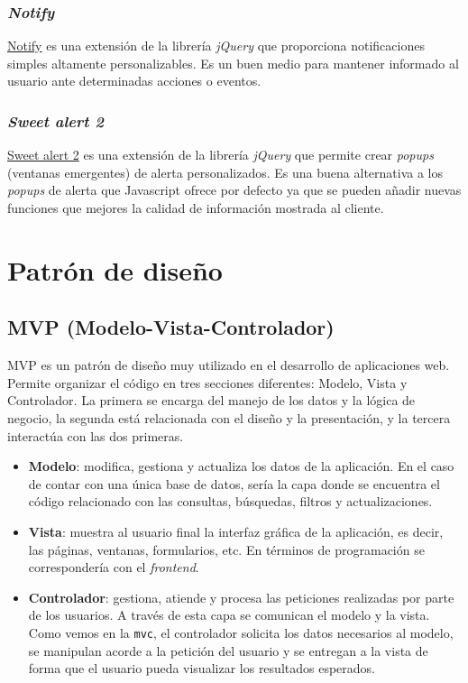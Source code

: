 \subsubsection{\emph{Notify}}

\href{https://notifyjs.jpillora.com/}{Notify} es una extensión de la
librería \emph{jQuery} que proporciona notificaciones simples altamente
personalizables. Es un buen medio para mantener informado al usuario
ante determinadas acciones o eventos.

\subsubsection{\emph{Sweet alert 2}}

\href{https://github.com/sweetalert2/sweetalert2}{Sweet alert 2} es una
extensión de la librería \emph{jQuery} que permite crear \emph{popups}
(ventanas emergentes) de alerta personalizados. Es una buena alternativa
a los \emph{popups} de alerta que Javascript ofrece por defecto ya que
se pueden añadir nuevas funciones que mejores la calidad de información
mostrada al cliente.

\section{Patrón de diseño}

\subsection{MVP (Modelo-Vista-Controlador)}

MVP es un patrón de diseño muy utilizado en el desarrollo de
aplicaciones web. Permite organizar el código en tres secciones
diferentes: Modelo, Vista y Controlador. La primera se encarga del
manejo de los datos y la lógica de negocio, la segunda está relacionada
con el diseño y la presentación, y la tercera interactúa con las dos
primeras.


\begin{itemize}
\tightlist
\item
  \textbf{Modelo}: modifica, gestiona y actualiza los datos de la
  aplicación. En el caso de contar con una única base de datos, sería la
  capa donde se encuentra el código relacionado con las consultas,
  búsquedas, filtros y actualizaciones.
\item
  \textbf{Vista}: muestra al usuario final la interfaz gráfica de la
  aplicación, es decir, las páginas, ventanas, formularios, etc. En
  términos de programación se correspondería con el \emph{frontend}.
\item
  \textbf{Controlador}: gestiona, atiende y procesa las peticiones
  realizadas por parte de los usuarios. A través de esta capa se
  comunican el modelo y la vista. Como vemos en la \texttt{mvc}, el
  controlador solicita los datos necesarios al modelo, se manipulan
  acorde a la petición del usuario y se entregan a la vista de forma que
  el usuario pueda visualizar los resultados esperados.
\end{itemize}

